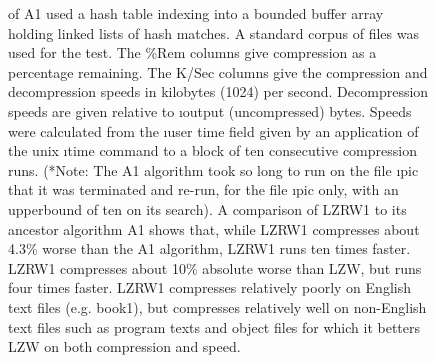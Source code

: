 \begin{figure}
{of A1 used  a hash table indexing into a  bounded buffer array holding
linked lists of hash matches. A  standard corpus of files was used for
the  test.  The  \%Rem  columns   give  compression  as  a  percentage
remaining. The  K/Sec columns  give the compression  and decompression
speeds in kilobytes (1024) per  second. Decompression speeds are given
relative to  \i{output} (uncompressed)  bytes. Speeds  were calculated
from  the \i{user}  time field  given by  an application  of the  unix
\i{time}  command to  a  block of  ten  consecutive compression  runs.
(*Note: The A1 algorithm took so long  to run on the file \i{pic} that
it  was terminated  and re-run,  for the  file \i{pic}  only, with  an
upperbound  of ten  on  its  search). A  comparison  of  LZRW1 to  its
ancestor algorithm A1  shows that, while LZRW1  compresses about 4.3\%
worse  than the  A1  algorithm, LZRW1  runs  ten  times faster.  LZRW1
compresses about  10\% absolute  worse than LZW,  but runs  four times
faster. LZRW1 compresses relatively poorly on English text files (e.g.
book1), but compresses relatively well  on non-English text files such
as program  texts and object  files for which  it betters LZW  on both
compression and speed.
%
}
\end{figure}

